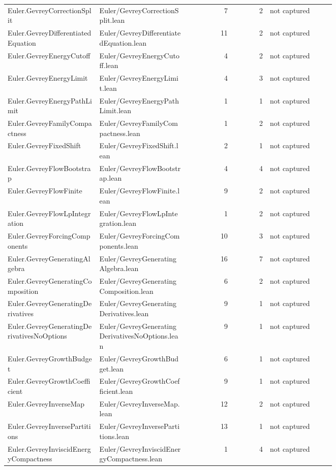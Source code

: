 \documentclass[10pt]{article}
\begin{document}
\begin{longtable}{p{0.28\linewidth}p{0.27\linewidth}r r p{0.20\linewidth}}
Euler.GevreyCorrectionSplit & Euler/GevreyCorrectionSplit.lean & 7 & 2 & not captured\\
Euler.GevreyDifferentiatedEquation & Euler/GevreyDifferentiatedEquation.lean & 11 & 2 & not captured\\
Euler.GevreyEnergyCutoff & Euler/GevreyEnergyCutoff.lean & 4 & 2 & not captured\\
Euler.GevreyEnergyLimit & Euler/GevreyEnergyLimit.lean & 4 & 3 & not captured\\
Euler.GevreyEnergyPathLimit & Euler/GevreyEnergyPathLimit.lean & 1 & 1 & not captured\\
Euler.GevreyFamilyCompactness & Euler/GevreyFamilyCompactness.lean & 1 & 2 & not captured\\
Euler.GevreyFixedShift & Euler/GevreyFixedShift.lean & 2 & 1 & not captured\\
Euler.GevreyFlowBootstrap & Euler/GevreyFlowBootstrap.lean & 4 & 4 & not captured\\
Euler.GevreyFlowFinite & Euler/GevreyFlowFinite.lean & 9 & 2 & not captured\\
Euler.GevreyFlowLpIntegration & Euler/GevreyFlowLpIntegration.lean & 1 & 2 & not captured\\
Euler.GevreyForcingComponents & Euler/GevreyForcingComponents.lean & 10 & 3 & not captured\\
Euler.GevreyGeneratingAlgebra & Euler/GevreyGeneratingAlgebra.lean & 16 & 7 & not captured\\
Euler.GevreyGeneratingComposition & Euler/GevreyGeneratingComposition.lean & 6 & 2 & not captured\\
Euler.GevreyGeneratingDerivatives & Euler/GevreyGeneratingDerivatives.lean & 9 & 1 & not captured\\
Euler.GevreyGeneratingDerivativesNoOptions & Euler/GevreyGeneratingDerivativesNoOptions.lean & 9 & 1 & not captured\\
Euler.GevreyGrowthBudget & Euler/GevreyGrowthBudget.lean & 6 & 1 & not captured\\
Euler.GevreyGrowthCoefficient & Euler/GevreyGrowthCoefficient.lean & 9 & 1 & not captured\\
Euler.GevreyInverseMap & Euler/GevreyInverseMap.lean & 12 & 2 & not captured\\
Euler.GevreyInversePartitions & Euler/GevreyInversePartitions.lean & 13 & 1 & not captured\\
Euler.GevreyInviscidEnergyCompactness & Euler/GevreyInviscidEnergyCompactness.lean & 1 & 4 & not captured\\

\end{longtable}
\end{document}
